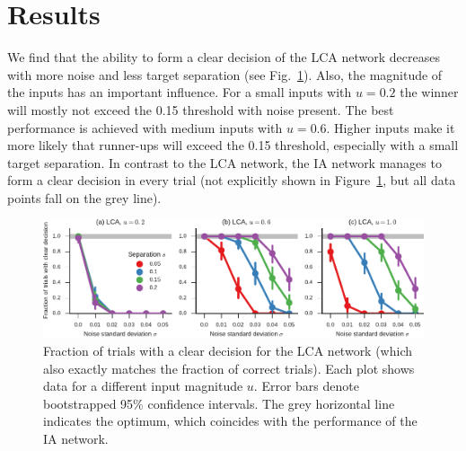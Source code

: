 \documentclass[10pt,letterpaper]{article}
\begin{document}
\section{Results}
We find that the ability to form a clear decision of the LCA network decreases with more noise and less target separation  (see Fig.~\ref{fig:decisions}).
Also, the magnitude of the inputs has an important influence.
For a small inputs with $u=0.2$ the winner will mostly not exceed the 0.15 threshold with noise present.
The best performance is achieved with medium inputs with $u=0.6$.
Higher inputs make it more likely that runner-ups will exceed the 0.15 threshold, especially with a small target separation.
In contrast to the LCA network, the IA network manages to form a clear decision in every trial (not explicitly shown in Figure~\ref{fig:decisions}, but all data points fall on the grey line).
\begin{figure}[t]
    \centering
    \includegraphics{figures/decisions}
    \caption{
        Fraction of trials with a clear decision for the LCA network (which also exactly matches the fraction of correct trials).
        Each plot shows data for a different input magnitude $u$.
        Error bars denote bootstrapped 95\% confidence intervals.
        The grey horizontal line indicates the optimum, which coincides with the performance of the IA network.
    }\label{fig:decisions}
\end{figure}
\end{document}
